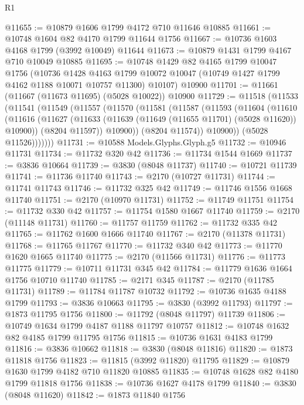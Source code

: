 \begin{lexlean}{R1}
\begin{coremodule}
@11655 := @10879 @1606 @1799 @4172 @710 @11646 @10885
@11661 := @10748 @1604 @82 @4170 @1799 @11644 @1756
@11667 := @10736 @1603 @4168 @1799 (@3992 @10049) @11644
@11673 := @10879 @1431 @1799 @4167 @710 @10049 @10885
@11695 := @10748
    @1429
    @82
    @4165
    @1799
    @10047
    @1756
    (@10736
      @1428
      @4163
      @1799
      @10072
      @10047
      (@10749 @1427 @1799 @4162 @1188 @10071 @10757 @11300)
      @10107)
    @10900
@11701 := @11661 (@11667 (@11673 @11695) (@5028 @10022)) @10900
@11729 := @11518
    (@11533
      (@11541
        (@11549
          (@11557
            (@11570
              (@11581
                (@11587
                  (@11593
                    (@11604
                      (@11610
                        (@11616
                          (@11627
                            (@11633 (@11639 (@11649 (@11655 @11701) (@5028 @11620)) @10900))
                            (@8204 @11597))
                          @10900))
                      (@8204 @11574))
                    @10900))
                (@5028 @11526)))))))
@11731 := @10588 Models.Glyphs.Glyph.g5
@11732 := @10946 @11731
@11734 := @11732 @320 @42
@11736 := @11734 @1544 @1669
@11737 := @3836 @10664
@11739 := @3830 (@8048 @11737)
@11740 := @10721 @11739
@11741 := @11736 @11740
@11743 := @2170 (@10727 @11731)
@11744 := @11741 @11743
@11746 := @11732 @325 @42
@11749 := @11746 @1556 @1668 @11740
@11751 := @2170 (@10970 @11731)
@11752 := @11749 @11751
@11754 := @11732 @330 @42
@11757 := @11754 @1580 @1667 @11740
@11759 := @2170 (@11148 @11731)
@11760 := @11757 @11759
@11762 := @11732 @335 @42
@11765 := @11762 @1600 @1666 @11740
@11767 := @2170 (@11378 @11731)
@11768 := @11765 @11767
@11770 := @11732 @340 @42
@11773 := @11770 @1620 @1665 @11740
@11775 := @2170 (@11566 @11731)
@11776 := @11773 @11775
@11779 := @10711 @11731 @345 @42
@11784 := @11779 @1636 @1664 @1756 @10710 @11740
@11785 := @2171 @345
@11787 := @2170 (@11785 @11731)
@11789 := @11784 @11787 @10732
@11792 := @10736 @1635 @4188 @1799
@11793 := @3836 @10663
@11795 := @3830 (@3992 @11793)
@11797 := @1873 @11795 @1756
@11800 := @11792 (@8048 @11797) @11739
@11806 := @10749 @1634 @1799 @4187 @1188 @11797 @10757
@11812 := @10748 @1632 @82 @4185 @1799 @11795 @1756
@11815 := @10736 @1631 @4183 @1799
@11816 := @3836 @10662
@11818 := @3830 (@8048 @11816)
@11820 := @1873 @11818 @1756
@11823 := @11815 (@3992 @11820) @11795
@11829 := @10879 @1630 @1799 @4182 @710 @11820 @10885
@11835 := @10748 @1628 @82 @4180 @1799 @11818 @1756
@11838 := @10736 @1627 @4178 @1799
@11840 := @3830 (@8048 @11620)
@11842 := @1873 @11840 @1756

\end{coremodule}
\end{lexlean}
